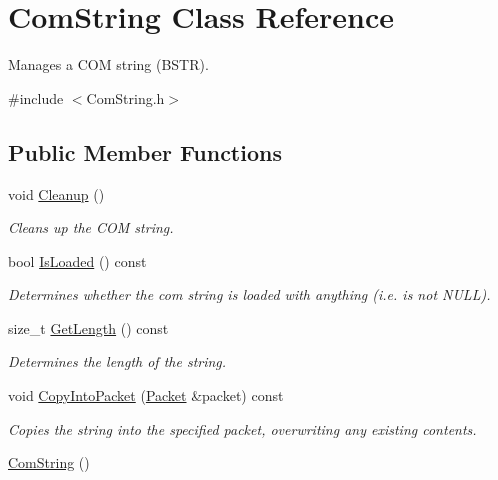 \hypertarget{class_com_string}{
\section{ComString Class Reference}
\label{class_com_string}
}


Manages a COM string (BSTR).  




{\ttfamily \#include $<$ComString.h$>$}

\subsection*{Public Member Functions}
\begin{DoxyCompactItemize}
\item 
\hypertarget{class_com_string_a49bebe8e55ea89985c8425bda7ff1018}{
void \hyperlink{class_com_string_a49bebe8e55ea89985c8425bda7ff1018}{Cleanup} ()}
\label{class_com_string_a49bebe8e55ea89985c8425bda7ff1018}

\begin{DoxyCompactList}\small\item\em Cleans up the COM string. \item\end{DoxyCompactList}\item 
bool \hyperlink{class_com_string_a5fe2049a372789ec73c9916448ac0e57}{IsLoaded} () const 
\begin{DoxyCompactList}\small\item\em Determines whether the com string is loaded with anything (i.e. is not NULL). \item\end{DoxyCompactList}\item 
size\_\-t \hyperlink{class_com_string_a560fca713d6fa9a6e1231889b54672e8}{GetLength} () const 
\begin{DoxyCompactList}\small\item\em Determines the length of the string. \item\end{DoxyCompactList}\item 
void \hyperlink{class_com_string_ae5aacdd617df0f7685dd46257dd7767d}{CopyIntoPacket} (\hyperlink{class_packet}{Packet} \&packet) const 
\begin{DoxyCompactList}\small\item\em Copies the string into the specified packet, overwriting any existing contents. \item\end{DoxyCompactList}\item 
\hypertarget{class_com_string_a230d0c147d15849387228c5338dc86e3}{
\hyperlink{class_com_string_a230d0c147d15849387228c5338dc86e3}{ComString} ()}
\label{class_com_string_a230d0c147d15849387228c5338dc86e3}


\end{DoxyCompactItemize}
